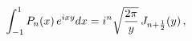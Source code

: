 \[\int_{-1}^{1}\mathop{P_{n}\/}\nolimits\!\left(x\right)e^{ixy}dx=i^{n}\sqrt{%
\frac{2\pi}{y}}\mathop{J_{n+\frac{1}{2}}\/}\nolimits\!\left(y\right),\]
